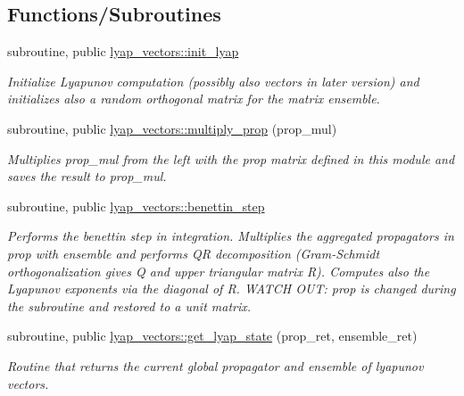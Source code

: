 \subsection*{Functions/\+Subroutines}
\begin{DoxyCompactItemize}
\item 
subroutine, public \hyperlink{namespacelyap__vectors_a72d9b0b0cb5933542de34def4cdef516}{lyap\+\_\+vectors\+::init\+\_\+lyap}
\begin{DoxyCompactList}\small\item\em Initialize Lyapunov computation (possibly also vectors in later version) and initializes also a random orthogonal matrix for the matrix ensemble. \end{DoxyCompactList}\item 
subroutine, public \hyperlink{namespacelyap__vectors_aec560ddebe1222a0df44b49125bf6d7b}{lyap\+\_\+vectors\+::multiply\+\_\+prop} (prop\+\_\+mul)
\begin{DoxyCompactList}\small\item\em Multiplies prop\+\_\+mul from the left with the prop matrix defined in this module and saves the result to prop\+\_\+mul. \end{DoxyCompactList}\item 
subroutine, public \hyperlink{namespacelyap__vectors_ae6948c534a6ec370975f3843a591720d}{lyap\+\_\+vectors\+::benettin\+\_\+step}
\begin{DoxyCompactList}\small\item\em Performs the benettin step in integration. Multiplies the aggregated propagators in prop with ensemble and performs QR decomposition (Gram-\/\+Schmidt orthogonalization gives Q and upper triangular matrix R). Computes also the Lyapunov exponents via the diagonal of R. W\+A\+T\+CH O\+UT\+: prop is changed during the subroutine and restored to a unit matrix. \end{DoxyCompactList}\item 
subroutine, public \hyperlink{namespacelyap__vectors_a081fa2db33f0a55e2639c558d39b3b24}{lyap\+\_\+vectors\+::get\+\_\+lyap\+\_\+state} (prop\+\_\+ret, ensemble\+\_\+ret)
\begin{DoxyCompactList}\small\item\em Routine that returns the current global propagator and ensemble of lyapunov vectors. \end{DoxyCompactList}\end{DoxyCompactItemize}
